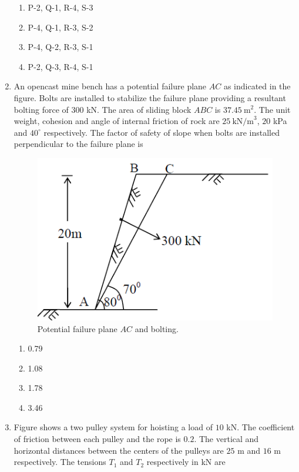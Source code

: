 \documentclass[journal]{IEEEtran}
\begin{document}
\begin{enumerate}[leftmargin=0pt]
\begin{multicols}{2}
\begin{enumerate}[label=(\Alph*),itemsep=0pt,topsep=2pt]
  \item P-2, Q-1, R-4, S-3
  \item P-4, Q-1, R-3, S-2
  \item P-4, Q-2, R-3, S-1
  \item P-2, Q-3, R-4, S-1
\end{enumerate}
\end{multicols}
\hfill{}
\newpage
\item An opencast mine bench has a potential failure plane $AC$ as indicated in the figure. Bolts are installed to stabilize the failure plane providing a resultant bolting force of $300$ kN. The area of sliding block $ABC$ is $37.45~\text{m}^2$. The unit weight, cohesion and angle of internal friction of rock are $25~\text{kN/m}^3$, $20$ kPa and $40^\circ$ respectively. The factor of safety of slope when bolts are installed perpendicular to the failure plane is
\begin{figure}[H]
\centering
\includegraphics[width=0.55\linewidth]{figs/opencast.png}
\caption{Potential failure plane $AC$ and bolting.}
\end{figure}
\begin{multicols}{2}
\begin{enumerate}[label=(\Alph*),itemsep=0pt,topsep=2pt]
  \item 0.79
  \item 1.08
  \item 1.78
  \item 3.46
\end{enumerate}
\end{multicols}
\hfill{}
\newpage
\item Figure shows a two pulley system for hoisting a load of $10$ kN. The coefficient of friction between each pulley and the rope is $0.2$. The vertical and horizontal distances between the centers of the pulleys are $25$ m and $16$ m respectively. The tensions $T_1$ and $T_2$ respectively in kN are

\end{enumerate}
\end{document}

